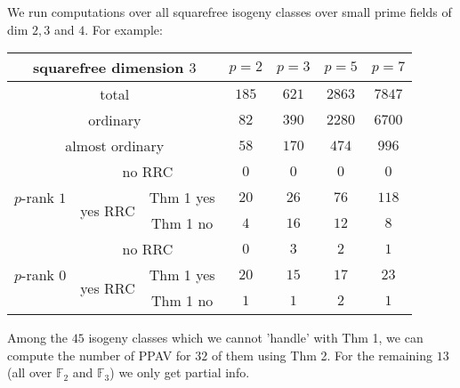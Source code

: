 \documentclass[usenames,dvipsnames]{beamer}
\def\F{\mathbb{F}}
\begin{document}
\begin{frame}{ }
	We run computations over all squarefree isogeny classes over small prime fields of dim $2,3$ and $4$. 
	\pause For example:
	\begin{table}[ht]
	    \centering
	    \small
	    \begin{tabular}{|c|c|c|c|c|c|c|}\hline
	\multicolumn{3}{|c|}{squarefree dimension $3$}                  & $p=2$ & $p=3$ & $p=5$ & $p=7$ \\\hline
	\multicolumn{3}{|c|}{total}                                     & $185$ & $621$  & $2863$ & $7847$ \\\hline                    
	\multicolumn{3}{|c|}{ordinary}                                  & $82$ & $390$  & $2280$  & $6700$ \\\hline
	\multicolumn{3}{|c|}{almost ordinary}                           & $58$ & $170$  & $474$  & $996$  \\\hline
	\multirow{3}{*}{$p$-rank $1$} & \multicolumn{2}{|c|}{no RRC}    & $0$ & $0$   & $0$   & $0$   \\\cline{2-7}
	                              & \multirow{2}{*}{yes RRC} & Thm 1 yes & $20$ & $26$   & $76$   & $118$   \\\cline{3-7}
	                              &                          & Thm 1 no  & $4$ & $16$   & $12$   & $8$   \\\hline
	\multirow{3}{*}{$p$-rank $0$}   & \multicolumn{2}{|c|}{no RRC}    & $0$ & $3$   & $2$   & $1$   \\\cline{2-7}
	                              & \multirow{2}{*}{yes RRC} & Thm 1 yes & $20$ & $15$   & $17$   & $23$   \\\cline{3-7}
	                              &                          & Thm 1 no  & $1$ & $1$   & $2$   & $1$   \\\hline                              
	    \end{tabular}
	\end{table}
    \pause Among the $45$ isogeny classes which we cannot 'handle' with Thm 1, we can compute the number of PPAV for $32$ of them using Thm 2. For the remaining $13$ (all over $\F_2$ and $\F_3$) we only get partial info.
\end{frame}
\end{document}
